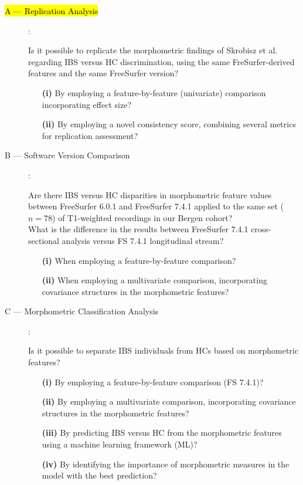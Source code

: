 \documentclass[diagnostics,article,accept,pdftex,moreauthors]{Definitions/mdpi}
\begin{document}
\begin{description}
  \item[\hl{A --- Replication Analysis} %
]\hspace{-8pt}: 


Is it possible to replicate the morphometric findings of Skrobisz et al. \cite{Skrobisz2022} regarding IBS versus HC discrimination, using the same FreSurfer-derived features and the same FreeSurfer version?
  \begin{enumerate}
    \item[\textbf{(i)}] By employing a feature-by-feature (univariate) comparison incorporating effect size?
    \item[\textbf{(ii)}] By employing a novel consistency score, combining several metrics for replication assessment? 

\end{enumerate}
\item[B --- Software Version Comparison]\hspace{-5pt}:



Are there IBS versus HC disparities in morphometric feature values between FreeSurfer 6.0.1 and FreeSurfer 7.4.1 applied to the same set  ($n=78$) of T1-weighted recordings in our Bergen cohort? \\
What is the difference in the results between FreeSurfer 7.4.1 cross-sectional analysis versus FS 7.4.1 longitudinal stream?
  \begin{enumerate}
    \item[\textbf{(i)}] When employing a feature-by-feature comparison?
    \item[\textbf{(ii)}] When employing a multivariate comparison, incorporating covariance structures in the morphometric features?
    \end{enumerate}

\item[C --- Morphometric Classification Analysis]\hspace{-5pt}: 


Is it possible to separate IBS individuals from HCs based on morphometric features?
      \begin{enumerate}
      \item[\textbf{(i)}] By employing a feature-by-feature comparison (FS 7.4.1)?
      \item[\textbf{(ii)}] By employing a multivariate comparison, incorporating covariance structures in the morphometric features?
      \item[\textbf{(iii)}] By predicting IBS versus HC from the morphometric features using a machine learning framework (ML)?
      \item[\textbf{(iv)}] By identifying the importance of morphometric measures in the model with the best prediction?
      \end{enumerate}


\end{description}
\end{document}

